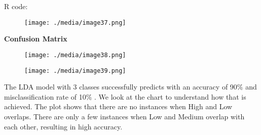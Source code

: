 \documentclass[12pt]{article}
\begin{document}
\vspace{\baselineskip}
\begin{justify}
R code:
\end{justify}\par




\begin{figure}[H]
	\begin{Center}
		\texttt{[image: ./media/image37.png]}
	\end{Center}
\end{figure}



\par

\begin{justify}
\textbf{Confusion Matrix}
\end{justify}\par




\begin{figure}[H]
	\begin{Center}
		\texttt{[image: ./media/image38.png]}
	\end{Center}
\end{figure}



\par




\begin{figure}[H]
	\begin{Center}
		\texttt{[image: ./media/image39.png]}
	\end{Center}
\end{figure}



\begin{justify}
The LDA model with 3 classes successfully predicts with an accuracy of 90$\%$  and misclassification rate of 10$\%$ . We look at the chart to understand how that is achieved. The plot shows that there are no instances when High and Low overlaps. There are only a few instances when Low and Medium overlap with each other, resulting in high accuracy. 
\end{justify}\par
\end{document}
